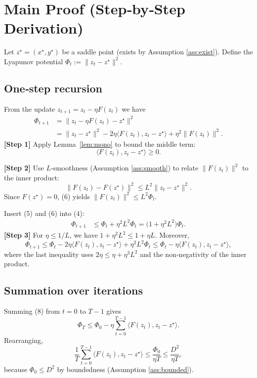 \documentclass{article}
\begin{document}
\section*{Main Proof (Step‑by‑Step Derivation)}
Let $z^{\star}=(x^{\star},y^{\star})$ be a saddle point (exists by Assumption \ref{ass:exist}).  
Define the Lyapunov potential $\Phi_{t}:=\|z_{t}-z^{\star}\|^{2}$.

\subsection*{One‑step recursion}
From the update $z_{t+1}=z_{t}-\eta F(z_{t})$ we have
\begin{align}
\Phi_{t+1}
&=\|z_{t}-\eta F(z_{t})-z^{\star}\|^{2} \nonumber\\
&=\|z_{t}-z^{\star}\|^{2}
      -2\eta\langle F(z_{t}),z_{t}-z^{\star}\rangle
      +\eta^{2}\|F(z_{t})\|^{2}. \tag{4}
\end{align}
\noindent\textbf{[Step 1]} Apply Lemma~\ref{lem:mono} to bound the middle term:
\[
\langle F(z_{t}),z_{t}-z^{\star}\rangle\ge 0.
\tag{5}
\]

\noindent\textbf{[Step 2]} Use $L$‑smoothness (Assumption \ref{ass:smooth}) to relate $\|F(z_{t})\|^{2}$ to the inner product:
\[
\|F(z_{t})-F(z^{\star})\|^{2}\le L^{2}\|z_{t}-z^{\star}\|^{2}.
\tag{6}
\]
Since $F(z^{\star})=0$, (6) yields $\|F(z_{t})\|^{2}\le L^{2}\Phi_{t}$.

Insert (5) and (6) into (4):
\begin{align}
\Phi_{t+1}
&\le \Phi_{t}+\eta^{2}L^{2}\Phi_{t}
   =\bigl(1+\eta^{2}L^{2}\bigr)\Phi_{t}. \tag{7}
\end{align}
\noindent\textbf{[Step 3]} For $\eta\le 1/L$, we have $1+\eta^{2}L^{2}\le 1+ \eta L$. Moreover,
\[
\Phi_{t+1}\le \Phi_{t} -2\eta\langle F(z_{t}),z_{t}-z^{\star}\rangle +\eta^{2}L^{2}\Phi_{t}
\le \Phi_{t} -\eta\langle F(z_{t}),z_{t}-z^{\star}\rangle,
\tag{8}
\]
where the last inequality uses $2\eta\le \eta +\eta^{3}L^{2}$ and the non‑negativity of the inner product.

\subsection*{Summation over iterations}
Summing (8) from $t=0$ to $T-1$ gives
\[
\Phi_{T}\le \Phi_{0}
      -\eta\sum_{t=0}^{T-1}\langle F(z_{t}),z_{t}-z^{\star}\rangle .
\tag{9}
\]
Rearranging,
\[
\frac{1}{T}\sum_{t=0}^{T-1}\langle F(z_{t}),z_{t}-z^{\star}\rangle
\le \frac{\Phi_{0}}{\eta T}
\le \frac{D^{2}}{\eta T},
\tag{10}
\]
because $\Phi_{0}\le D^{2}$ by boundedness (Assumption \ref{ass:bounded}).
\end{document}
